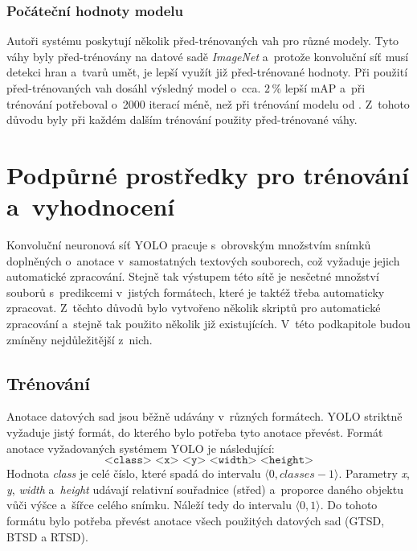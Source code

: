 \subsubsection*{Počáteční hodnoty modelu}
Autoři systému poskytují několik před-trénovaných vah pro různé modely. Tyto váhy byly před-trénovány na datové sadě \emph{ImageNet} a~protože konvoluční síť musí detekci hran a~tvarů umět, je lepší využít již před-trénované hodnoty. Při použití před-trénovaných vah dosáhl výsledný model o~cca. $2\,\%$ lepší mAP a~při trénování potřeboval o~2000 iterací méně, než při trénování modelu od . Z~tohoto důvodu byly při každém dalším trénování použity před-trénované váhy.




\section{Podpůrné prostředky pro trénování a~vyhodnocení}
\label{podpurneSkripty}
Konvoluční neuronová síť YOLO pracuje s~obrovským množstvím snímků doplněných o~anotace v~samostatných textových souborech, což vyžaduje jejich automatické zpracování. Stejně tak výstupem této sítě je nesčetné množství souborů s~predikcemi v~jistých formátech, které je taktéž třeba automaticky zpracovat. Z~těchto důvodů bylo vytvořeno několik skriptů pro automatické zpracování a~stejně tak použito několik již existujících. V~této podkapitole budou zmíněny nejdůležitější z~nich.

\subsection*{Trénování}
Anotace datových sad jsou běžně udávány v~různých formátech. YOLO striktně vyžaduje jistý formát, do kterého bylo potřeba tyto anotace převést. Formát anotace vyžadovaných systémem YOLO je následující:
$$\texttt{<class> <x> <y> <width> <height>}$$
Hodnota \emph{class} je celé číslo, které spadá do intervalu $\langle0,classes-1\rangle$. Parametry \emph{x}, \emph{y}, \emph{width} a~\emph{height} udávají relativní souřadnice (střed) a~proporce daného objektu vůči výšce a~šířce celého snímku. Náleží tedy do intervalu $\langle0,1\rangle$. Do tohoto formátu bylo potřeba převést anotace všech použitých datových sad (GTSD, BTSD a RTSD).

